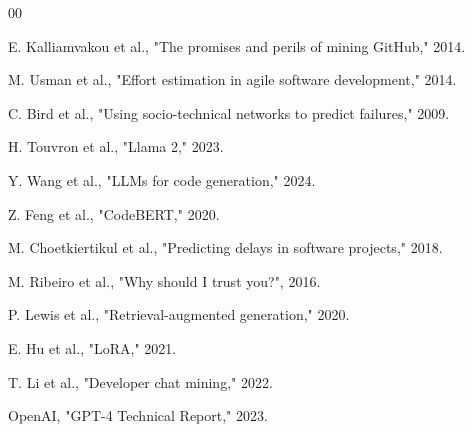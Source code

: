 \documentclass[journal]{IEEEtran}
\begin{document}
\begin{thebibliography}{00}

E. Kalliamvakou et al., "The promises and perils of mining GitHub," 2014.

M. Usman et al., "Effort estimation in agile software development," 2014.

C. Bird et al., "Using socio-technical networks to predict failures," 2009.

H. Touvron et al., "Llama 2," 2023.

Y. Wang et al., "LLMs for code generation," 2024.

Z. Feng et al., "CodeBERT," 2020.

M. Choetkiertikul et al., "Predicting delays in software projects," 2018.

M. Ribeiro et al., "Why should I trust you?", 2016.

P. Lewis et al., "Retrieval-augmented generation," 2020.

E. Hu et al., "LoRA," 2021.

T. Li et al., "Developer chat mining," 2022.

OpenAI, "GPT-4 Technical Report," 2023.

\end{thebibliography}
\end{document}
